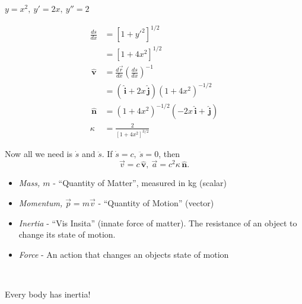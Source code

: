 \documentclass[twoside]{scrartcl}
\newcommand{\vsp}{\vspace*{5pt}}
\let\oldhat\hat
\renewcommand{\hat}[1]{\,\oldhat{\boldsymbol{\mathbf{#1}}}}
\begin{document}
\begin{example}
$y = x^2,~y' = 2x,~ y'' = 2$

\[\begin{aligned}
\frac{ds}{dx} &= [1 + y'^2]^{1/2}\\	
&= [1 + 4x^2]^{1/2}\\[0.5cm]
\hat{v} &= \frac{d\vec{r}}{dx}\left(\frac{ds}{dx}\right)^{-1}\\
&= (\hat{i} + 2x\hat{j})(1 + 4x^2)^{-1/2}\\[0.5cm]
\hat{n} &= (1 + 4x^2)^{-1/2}(-2x\hat{i} + \hat{j})\\
\kappa &= \frac{2}{[1+4x^2]^{3/2}}
\end{aligned}
\]	

Now all we need is $\dot{s}$ and $\ddot{s}$. If $\dot{s} =c,~\ddot{s} = 0$, then
\[\vec{v} = c\hat{v},~ \vec{a} = c^2\kappa\hat{n}.\]
\end{example}

\vsp


\begin{definition}
\begin{itemize}

\item \emph{Mass, $m$} - ``Quantity of Matter'', measured in kg (scalar)

\item \emph{Momentum, $\vec{p} = m\vec{v}$} - ``Quantity of Motion'' (vector)

\item \emph{Inertia} - ``Vis Insita'' (innate force of matter). The resistance of an object to change its state of motion.

\item \emph{Force} - An action that changes an objects state of motion
\end{itemize}
\end{definition}~

\begin{theorem}
Every body has inertia! 	
\end{theorem}
\end{document}
